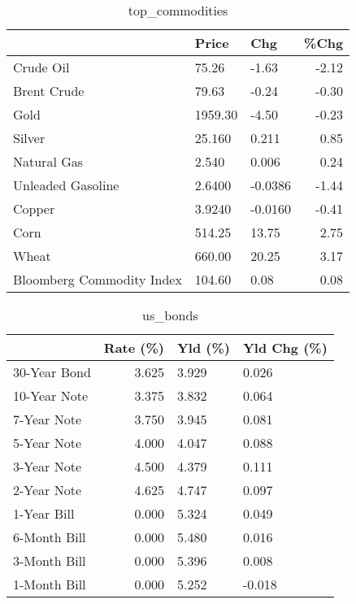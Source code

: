 \documentclass{article}%
\begin{document}
\begin{table}[htbp]%
\caption{top\_commodities}%
\centering%
\begin{adjustbox}{width=1\textwidth}%
\begin{tabular}{lllr}
\toprule
                          &   Price &     Chg &  \%Chg \\
\midrule
               Crude Oil  &   75.26 &   -1.63 & -2.12 \\
             Brent Crude  &   79.63 &   -0.24 & -0.30 \\
                    Gold  & 1959.30 &   -4.50 & -0.23 \\
                  Silver  &  25.160 &   0.211 &  0.85 \\
             Natural Gas  &   2.540 &   0.006 &  0.24 \\
       Unleaded Gasoline  &  2.6400 & -0.0386 & -1.44 \\
                  Copper  &  3.9240 & -0.0160 & -0.41 \\
                    Corn  &  514.25 &   13.75 &  2.75 \\
                   Wheat  &  660.00 &   20.25 &  3.17 \\
Bloomberg Commodity Index &  104.60 &    0.08 &  0.08 \\
\bottomrule
\end{tabular}
%
\end{adjustbox}%
\end{table}

%


\begin{table}[htbp]%
\caption{us\_bonds}%
\centering%
\begin{adjustbox}{width=1\textwidth}%
\begin{tabular}{lrll}
\toprule
             &  Rate (\%) & Yld (\%) & Yld Chg (\%) \\
\midrule
30-Year Bond &     3.625 &   3.929 &       0.026 \\
10-Year Note &     3.375 &   3.832 &       0.064 \\
 7-Year Note &     3.750 &   3.945 &       0.081 \\
 5-Year Note &     4.000 &   4.047 &       0.088 \\
 3-Year Note &     4.500 &   4.379 &       0.111 \\
 2-Year Note &     4.625 &   4.747 &       0.097 \\
 1-Year Bill &     0.000 &   5.324 &       0.049 \\
6-Month Bill &     0.000 &   5.480 &       0.016 \\
3-Month Bill &     0.000 &   5.396 &       0.008 \\
1-Month Bill &     0.000 &   5.252 &      -0.018 \\
\bottomrule
\end{tabular}
%
\end{adjustbox}%
\end{table}
\end{document}
